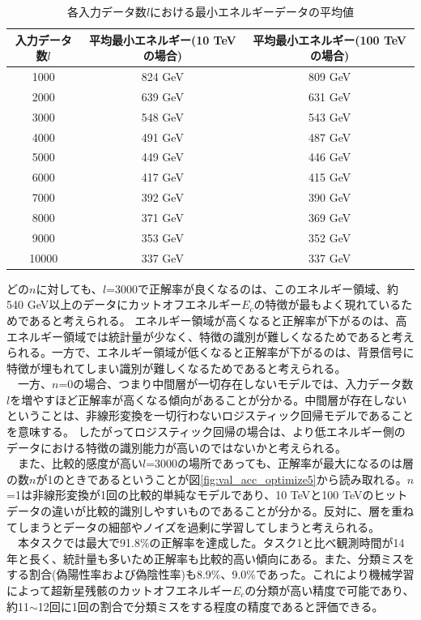 \documentclass[a4paper,11truept]{ltjsreport}
\begin{document}
\begin{table}[H]
  \centering
  \caption{各入力データ数$l$における最小エネルギーデータの平均値}
  \label{tab:energy_range}
  \begin{tabular}{|c|c|c|}
    \hline
    入力データ数$l$ & 平均最小エネルギー(10 TeVの場合) & 平均最小エネルギー(100 TeVの場合) \\
    \hline
    1000 & 824 GeV & 809 GeV \\
    \hline
    2000 & 639 GeV & 631 GeV \\
    \hline
    3000 & 548 GeV & 543 GeV \\
    \hline
    4000 & 491 GeV & 487 GeV \\
    \hline
    5000 & 449 GeV & 446 GeV \\
    \hline
    6000 & 417 GeV & 415 GeV \\
    \hline
    7000 & 392 GeV & 390 GeV \\
    \hline
    8000 & 371 GeV & 369 GeV \\
    \hline
    9000 & 353 GeV & 352 GeV \\
    \hline
    10000 & 337 GeV & 337 GeV \\
    \hline
  \end{tabular}
\end{table}
どの$n$に対しても、$l$=3000で正解率が良くなるのは、このエネルギー領域、約540 GeV以上のデータにカットオフエネルギー$E_c$の特徴が最もよく現れているためであると考えられる。
エネルギー領域が高くなると正解率が下がるのは、高エネルギー領域では統計量が少なく、特徴の識別が難しくなるためであると考えられる。一方で、エネルギー領域が低くなると正解率が下がるのは、背景信号に特徴が埋もれてしまい識別が難しくなるためであると考えられる。\\
　一方、$n$=0の場合、つまり中間層が一切存在しないモデルでは、入力データ数$l$を増やすほど正解率が高くなる傾向があることが分かる。中間層が存在しないということは、非線形変換を一切行わないロジスティック回帰モデルであることを意味する。
したがってロジスティック回帰の場合は、より低エネルギー側のデータにおける特徴の識別能力が高いのではないかと考えられる。\\
　また、比較的感度が高い$l$=3000の場所であっても、正解率が最大になるのは層の数$n$が1のときであるということが図\ref{fig:val_acc_optimize5}から読み取れる。$n$=1は非線形変換が1回の比較的単純なモデルであり、10 TeVと100 TeVのヒットデータの違いが比較的識別しやすいものであることが分かる。反対に、層を重ねてしまうとデータの細部やノイズを過剰に学習してしまうと考えられる。\\
　本タスクでは最大で91.8\%の正解率を達成した。タスク1と比べ観測時間が14年と長く、統計量も多いため正解率も比較的高い傾向にある。また、分類ミスをする割合(偽陽性率および偽陰性率)も8.9\%、9.0\%であった。これにより機械学習によって超新星残骸のカットオフエネルギー$E_c$の分類が高い精度で可能であり、約11$\sim$12回に1回の割合で分類ミスをする程度の精度であると評価できる。
\end{document}
